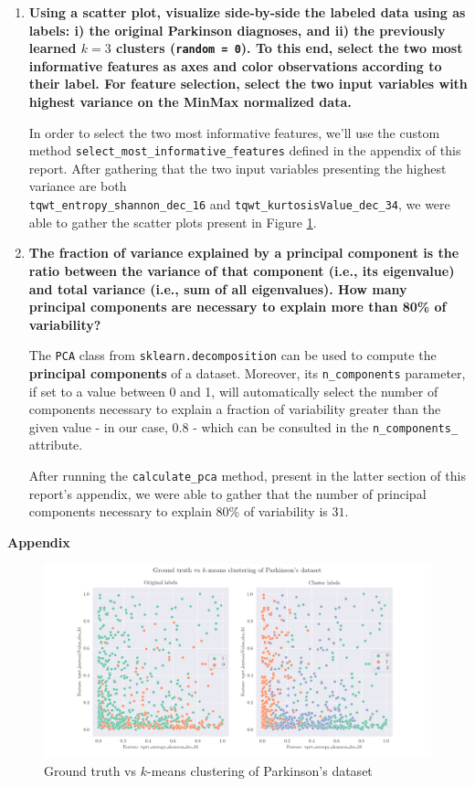 \documentclass[12pt]{article}
\begin{document}
\begin{enumerate}[leftmargin=\labelsep,resume]
        \pagebreak

  \item \textbf{Using a scatter plot, visualize side-by-side the labeled data using as labels: i) the original
          Parkinson diagnoses, and ii) the previously learned $k = 3$ clusters (\texttt{random = 0}). To this end, select
          the two most informative features as axes and color observations according to their label. For feature
          selection, select the two input variables with highest variance on the MinMax normalized data.}

        In order to select the two most informative features, we'll use the
        custom method \texttt{select\_most\_informative\_features} defined in
        the appendix of this report. After gathering that the two
        input variables presenting the highest variance are both \\
        \texttt{tqwt\_entropy\_shannon\_dec\_16} and
        \texttt{tqwt\_kurtosisValue\_dec\_34}, we were able to gather the
        scatter plots present in Figure \ref{fig:diagnoses-plots}.

  \item \textbf{The fraction of variance explained by a principal component is the ratio between the
          variance of that component (i.e., its eigenvalue) and total variance (i.e., sum of all eigenvalues).
          How many principal components are necessary to explain more than 80\% of variability?}

        The \texttt{PCA} class from \texttt{sklearn.decomposition} can be used to
        compute the \textbf{principal components} of a dataset. Moreover, its
        \texttt{n\_components} parameter, if set to a value between 0 and 1, will
        automatically select the number of components necessary to explain a fraction
        of variability greater than the given value - in our case, 0.8 - which can
        be consulted in the \texttt{n\_components\_} attribute.

        After running the \texttt{calculate\_pca} method, present in the latter
        section of this report's appendix, we were able to gather that the
        number of principal components necessary to explain 80\% of variability
        is $31$.

\end{enumerate}

\pagebreak

\large{\textbf{Appendix}\vskip 0.3cm}



\begin{figure}[H]
  \centering
  \includegraphics[width=\textwidth]{../assets/parkinsons.png}
  \caption{Ground truth vs $k$-means clustering of Parkinson's dataset}
  \label{fig:diagnoses-plots}
\end{figure}
\end{document}
